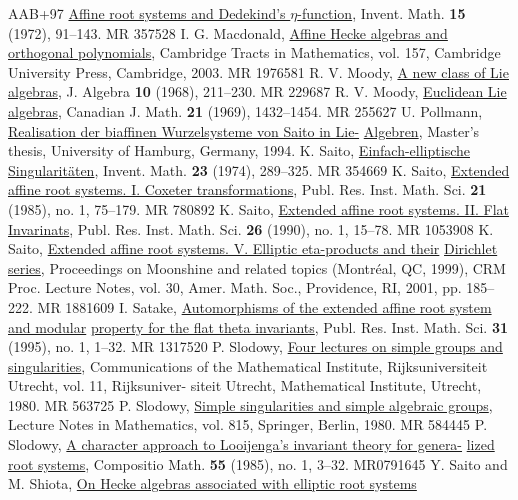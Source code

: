 \documentclass[11pt]{amsart}
\begin{document}
{\begin{thebibliography}{AAB+97}
\underline{Affine root systems and Dedekind’s $\eta$-function}, 
Invent. Math. {\bf 15} (1972), 91–143. MR 357528
I. G. Macdonald,
\underline{Affine Hecke algebras and orthogonal polynomials}, 
Cambridge Tracts in Mathematics, vol. 157, Cambridge University Press, 
Cambridge, 2003. MR 1976581
R. V. Moody, 
\underline{A new class of Lie algebras}, 
J. Algebra {\bf 10} (1968), 211–230. MR 229687
R. V. Moody,
\underline{Euclidean Lie algebras}, 
Canadian J. Math. {\bf 21} (1969), 1432–1454. MR 255627
U. Pollmann,
\underline{Realisation der biaffinen Wurzelsysteme von Saito in Lie-}
\underline{Algebren}, 
Master’s thesis, University of Hamburg, Germany, 1994.
K. Saito, 
\underline{Einfach-elliptische Singularit\"{a}ten}, 
Invent. Math. {\bf 23} (1974), 289–325. MR 354669
K. Saito, 
\underline{Extended affine root systems. I. Coxeter transformations}, 
Publ. Res. Inst. Math. Sci. {\bf 21} (1985), no. 1, 75–179. MR 780892
K. Saito, 
\underline{Extended affine root systems. II. Flat Invarinats}, 
Publ. Res. Inst. Math. Sci. {\bf 26} (1990), no. 1, 15–78. MR 1053908
K. Saito, 
\underline{Extended affine root systems. V. Elliptic eta-products and their} 
\underline{Dirichlet series}, 
Proceedings on Moonshine and related topics (Montréal, QC, 1999), 
CRM Proc. Lecture Notes, vol. 30, Amer. Math. Soc., Providence, RI, 2001, 
pp. 185–222. MR 1881609
I. Satake, 
\underline{Automorphisms of the extended affine root system and modular} 
\underline{property for the flat theta invariants}, 
Publ. Res. Inst. Math. Sci. {\bf 31} (1995), no. 1, 1–32. MR 1317520
P. Slodowy, 
\underline{Four lectures on simple groups and singularities}, 
Communications of the Mathematical Institute, Rijksuniversiteit Utrecht, vol. 11, 
Rijksuniver- siteit Utrecht, Mathematical Institute, Utrecht, 1980. MR 563725
P. Slodowy, 
\underline{Simple singularities and simple algebraic groups}, 
Lecture Notes in Mathematics, vol. 815, Springer, Berlin, 1980. MR 584445
P. Slodowy, 
\underline{A character approach to Looijenga's invariant theory for genera-}
\underline{lized root systems}, 
Compositio Math. {\bf 55} (1985), no. 1, 3–32. MR0791645
Y. Saito and M. Shiota, 
\underline{On Hecke algebras associated with elliptic root systems} 

\end{thebibliography}}
\end{document}
